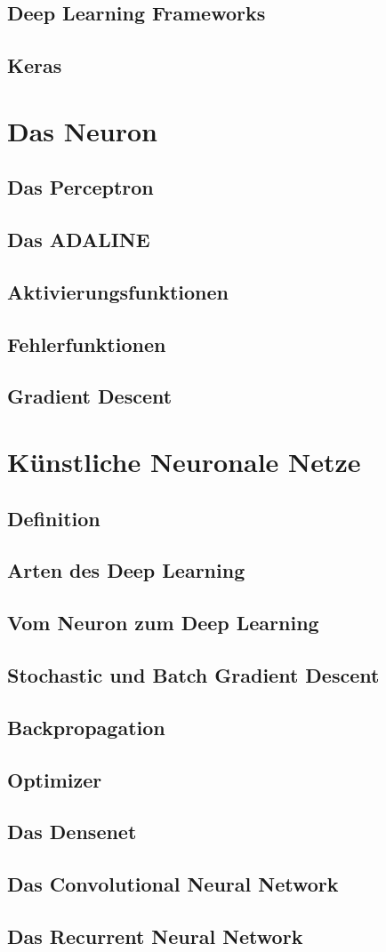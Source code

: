 \documentclass[conference, german]{IEEEtran}
\begin{document}
\subsection{Deep Learning Frameworks}
\subsection{Keras}
\section{Das Neuron}
\subsection{Das Perceptron}
\subsection{Das ADALINE}
\subsection{Aktivierungsfunktionen}
\subsection{Fehlerfunktionen  }
\subsection{Gradient Descent}
\section{Künstliche Neuronale Netze}
\subsection{Definition}
\subsection{Arten des Deep Learning}
\subsection{Vom Neuron zum Deep Learning}
\subsection{Stochastic und Batch Gradient Descent}
\subsection{Backpropagation}
\subsection{Optimizer}
\subsection{Das Densenet}
\subsection{Das Convolutional Neural Network}
\subsection{Das Recurrent Neural Network}
\end{document}

